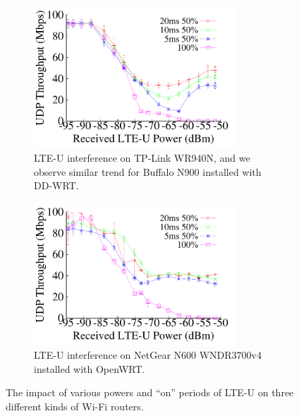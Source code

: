 \begin{figure}[t] \centering 
    \begin{subfigure}[b]{\linewidth} \centering
     \includegraphics[width=3.0in, angle=0]{./figures/impact_power_tplink} 
         \vspace{-0.0cm}
         \caption{LTE-U interference on TP-Link WR940N, and we observe similar trend for Buffalo N900 installed with DD-WRT.}         
        \label{impact_power:a}
    \end{subfigure} %

    \begin{subfigure}[b]{\linewidth}  \centering 
     \includegraphics[width=3.0in, angle=0]{./figures/impact_power_openwrt}  
        \vspace{-0.0cm}
        \caption{LTE-U interference on NetGear N600 WNDR3700v4 installed with OpenWRT.}
        \label{impact_power:b}    
    \end{subfigure} 
\caption{The impact of various powers and ``on'' periods of LTE-U on three different kinds of Wi-Fi routers.}
\label{impact_power}
\vspace{-0.2cm}
\end{figure}


